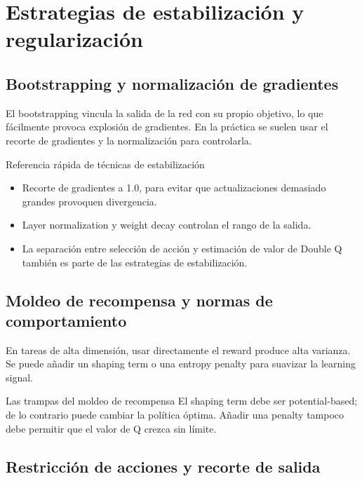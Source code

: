 \documentclass[a4paper]{article}
\begin{document}
\section{Estrategias de estabilización y regularización}

\subsection{Bootstrapping y normalización de gradientes}

El bootstrapping vincula la salida de la red con su propio objetivo, lo que fácilmente provoca explosión de gradientes. En la práctica se suelen usar el recorte de gradientes y la normalización para controlarla.

\begin{importantbox}{Referencia rápida de técnicas de estabilización}
\begin{itemize}
    \item Recorte de gradientes a 1.0, para evitar que actualizaciones demasiado grandes provoquen divergencia.
    \item Layer normalization y weight decay controlan el rango de la salida.
    \item La separación entre selección de acción y estimación de valor de Double Q también es parte de las estrategias de estabilización.
\end{itemize}
\end{importantbox}

\subsection{Moldeo de recompensa y normas de comportamiento}

En tareas de alta dimensión, usar directamente el reward produce alta varianza. Se puede añadir un shaping term o una entropy penalty para suavizar la learning signal.

\begin{warningbox}{Las trampas del moldeo de recompensa}
El shaping term debe ser potential-based; de lo contrario puede cambiar la política óptima. Añadir una penalty tampoco debe permitir que el valor de Q crezca sin límite.
\end{warningbox}

\subsection{Restricción de acciones y recorte de salida}
\end{document}
